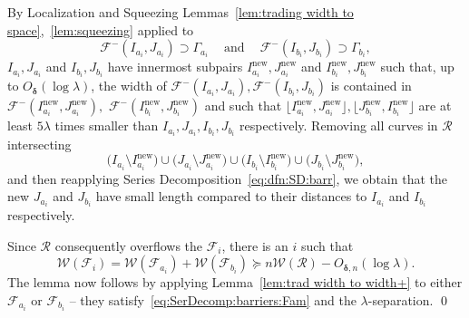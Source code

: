 \documentclass{amsart}
\renewcommand{\sp}{{\ \ }}
\newcommand{\1}{{\mathbb 1 }}
\newcommand{\Fam}{{\mathcal F}}
\newcommand{\Width}{{\mathcal W}}
\newcommand\RR{\mathcal{R}}
\newcommand\new{{\operatorname{new}}}
\theoremstyle{remark}
\numberwithin{equation}{section}
\theoremstyle{definition}
\newcommand{\bdelta}{{\boldsymbol{ \delta}}}
\begin{document}
 
By Localization and Squeezing Lemmas~\ref{lem:trading  width to space},~\ref{lem:squeezing} applied to \[\Fam^-(I_{a_i}, J_{a_i})\supset \Gamma_{a_i}\sp\sp\text{ and }\sp\sp \Fam^-(I_{b_i}, J_{b_i})\supset \Gamma_{b_i},\] 
$I_{a_i}, J_{a_i}$ and $I_{b_i}, J_{b_i}$ have innermost subpairs $I^\new_{a_i}, J^\new_{a_i}$ and $I^\new_{b_i}, J^\new_{b_i}$ such that, up to $O_\bdelta(\log \lambda)$, the width of $\Fam^-(I_{a_i}, J_{a_i}), \Fam^-(I_{b_i}, J_{b_i})$ is contained in $\Fam^-(I^\new_{a_i}, J^\new_{a_i}),$ $\Fam^-(I^\new_{b_i}, J^\new_{b_i})$ and such that $\lfloor I^\new_{a_i}, J^\new_{a_i}\rfloor, \lfloor J^\new_{b_i}, I^\new_{b_i}\rfloor$ are at least $5\lambda$ times smaller than $I_{a_i}, J_{a_i}, I_{b_i}, J_{b_i}$ respectively. Removing all curves in $\RR$ intersecting
\[ \big(I_{a_i}\setminus I^\new_{a_i}\big)\cup  \big(J_{a_i}\setminus J^\new_{a_i}\big)\cup  \big(I_{b_i}\setminus I^\new_{b_i}\big)\cup \big(J_{b_i}\setminus J^\new_{b_i}\big),\]
and then reapplying Series Decomposition~\ref{eq:dfn:SD:barr}, we obtain that the new $J_{a_i}$ and $J_{b_i}$ have small length compared to their distances to $I_{a_i}$ and $I_{b_i}$ respectively. 

Since $\RR$ consequently overflows the $\Fam_i$, there is an $i$ such that \[\Width(\Fam_i)= \Width(\Fam_{a_i})+\Width(\Fam_{b_i})\succeq n\Width(\RR) - O_{\bdelta, n} (\log \lambda).\]
The lemma now follows by applying Lemma~\ref{lem:trad width to width+} to either $\Fam_{a_i}$ or $\Fam_{b_i}$ -- they satisfy~\eqref{eq:SerDecomp:barriers:Fam} and the $\lambda$-separation.
\qed
 
\end{document}
